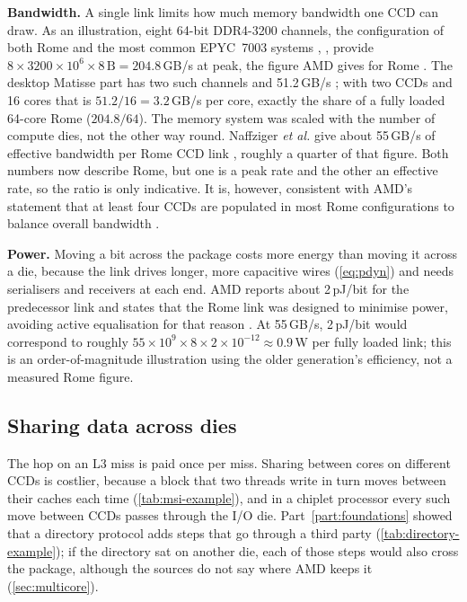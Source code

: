 \textbf{Bandwidth.} A single link limits how much memory bandwidth one CCD can draw. As an illustration, eight 64-bit DDR4-3200 channels, the configuration of both Rome and the most common EPYC~7003 systems \cite[slide~19]{suggs2019zen2}, \cite{amd2022epyc7003}, provide $8 \times 3200 \times 10^6 \times 8\,\mathrm{B} = 204.8$\,GB/s at peak, the figure AMD gives for Rome \cite[slide~19]{suggs2019zen2}. The desktop Matisse part has two such channels and 51.2\,GB/s \cite[slide~15]{suggs2019zen2}; with two CCDs and 16 cores that is $51.2/16 = 3.2$\,GB/s per core, exactly the share of a fully loaded 64-core Rome ($204.8/64$). The memory system was scaled with the number of compute dies, not the other way round. Naffziger \emph{et al.} give about 55\,GB/s of effective bandwidth per Rome CCD link \cite{naffziger2020chiplet}, roughly a quarter of that figure. Both numbers now describe Rome, but one is a peak rate and the other an effective rate, so the ratio is only indicative. It is, however, consistent with AMD's statement that at least four CCDs are populated in most Rome configurations to balance overall bandwidth \cite{naffziger2020chiplet}.

\textbf{Power.} Moving a bit across the package costs more energy than moving it across a die, because the link drives longer, more capacitive wires (\cref{eq:pdyn}) and needs serialisers and receivers at each end. AMD reports about 2\,pJ/bit for the predecessor link and states that the Rome link was designed to minimise power, avoiding active equalisation for that reason \cite{naffziger2020chiplet}. At 55\,GB/s, 2\,pJ/bit would correspond to roughly $55 \times 10^9 \times 8 \times 2 \times 10^{-12} \approx 0.9$\,W per fully loaded link; this is an order-of-magnitude illustration using the older generation's efficiency, not a measured Rome figure.

\subsection{Sharing data across dies}
\label{sec:cross-ccd}
The hop on an L3 miss is paid once per miss. Sharing between cores on different CCDs is costlier, because a block that two threads write in turn moves between their caches each time (\cref{tab:msi-example}), and in a chiplet processor every such move between CCDs passes through the I/O die. Part~\ref{part:foundations} showed that a directory protocol adds steps that go through a third party (\cref{tab:directory-example}); if the directory sat on another die, each of those steps would also cross the package, although the sources do not say where AMD keeps it (\cref{sec:multicore}).

